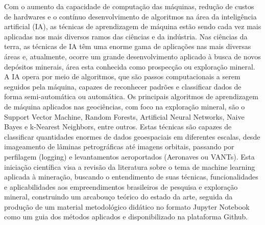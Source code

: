 \par{Com o aumento da capacidade de computação das máquinas, redução de custos de hardwares e o contínuo desenvolvimento de algoritmos na área da inteligência artificial (IA), as técnicas de aprendizagem de máquina estão sendo cada vez mais aplicadas nos mais diversos ramos das ciências e da indústria. Nas ciências da terra, as técnicas de IA têm uma enorme gama de aplicações nas mais diversas áreas e, atualmente, ocorre um grande desenvolvimento aplicado à busca de novos depósitos minerais, área esta conhecida como prospecção ou exploração mineral. A IA opera por meio de algoritmos, que são passos computacionais a serem seguidos pela máquina, capazes de reconhecer padrões e classificar dados de forma semi-automática ou automática. Os principais algoritmos de aprendizagem de máquina aplicados nas geociências, com foco na exploração mineral, são o Support Vector Machine, Random Forests, Artificial Neural Networks, Naive Bayes e k-Nearest Neighbors, entre outros. Estas técnicas são capazes de classificar quantidades enormes de dados geoespaciais em diferentes escalas, desde imageamento de lâminas petrográficas até imagens orbitais, passando por perfilagem (logging) e levantamentos aeroportados (Aeronaves ou VANTs). Esta iniciação científica visa a revisão da literatura sobre o tema de machine learning aplicada à mineração, buscando o entendimento de suas técnicas, funcionalidades e aplicabilidades aos empreendimentos brasileiros de pesquisa e exploração mineral, construindo um arcabouço teórico do estado da arte, seguida da produção de um material metodológico didático no formato Jupyter Notebook como um guia dos métodos aplicados e disponibilizado na plataforma Github.}
